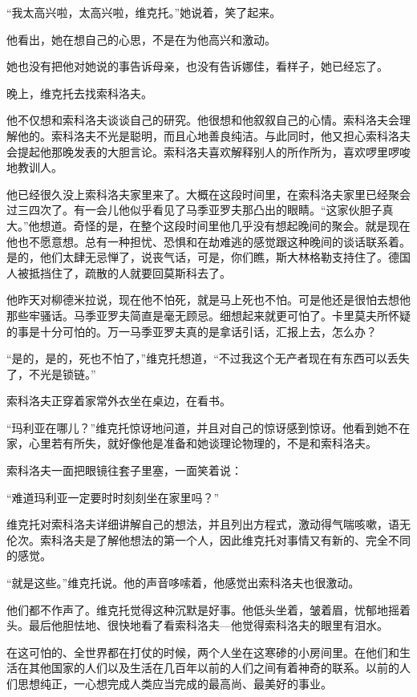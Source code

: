 “我太高兴啦，太高兴啦，维克托。”她说着，笑了起来。

他看出，她在想自己的心思，不是在为他高兴和激动。

她也没有把他对她说的事告诉母亲，也没有告诉娜佳，看样子，她已经忘了。

晚上，维克托去找索科洛夫。

他不仅想和索科洛夫谈谈自己的研究。他很想和他叙叙自己的心情。索科洛夫会理解他的。索科洛夫不光是聪明，而且心地善良纯洁。与此同时，他又担心索科洛夫会提起他那晚发表的大胆言论。索科洛夫喜欢解释别人的所作所为，喜欢啰里啰唆地教训人。

他已经很久没上索科洛夫家里来了。大概在这段时间里，在索科洛夫家里已经聚会过三四次了。有一会儿他似乎看见了马季亚罗夫那凸出的眼睛。“这家伙胆子真大。”他想道。奇怪的是，在整个这段时间里他几乎没有想起晚间的聚会。就是现在他也不愿意想。总有一种担忧、恐惧和在劫难逃的感觉跟这种晚间的谈话联系着。是的，他们太肆无忌惮了，说丧气话，可是，你们瞧，斯大林格勒支持住了。德国人被抵挡住了，疏散的人就要回莫斯科去了。

他昨天对柳德米拉说，现在他不怕死，就是马上死也不怕。可是他还是很怕去想他那些牢骚话。马季亚罗夫简直是毫无顾忌。细想起来就更可怕了。卡里莫夫所怀疑的事是十分可怕的。万一马季亚罗夫真的是拿话引话，汇报上去，怎么办？

“是的，是的，死也不怕了，”维克托想道，“不过我这个无产者现在有东西可以丢失了，不光是锁链。”

索科洛夫正穿着家常外衣坐在桌边，在看书。

“玛利亚在哪儿？”维克托惊讶地问道，并且对自己的惊讶感到惊讶。他看到她不在家，心里若有所失，就好像他是准备和她谈理论物理的，不是和索科洛夫。

索科洛夫一面把眼镜往套子里塞，一面笑着说：

“难道玛利亚一定要时时刻刻坐在家里吗？”

维克托对索科洛夫详细讲解自己的想法，并且列出方程式，激动得气喘咳嗽，语无伦次。索科洛夫是了解他想法的第一个人，因此维克托对事情又有新的、完全不同的感觉。

“就是这些。”维克托说。他的声音哆嗦着，他感觉出索科洛夫也很激动。

他们都不作声了。维克托觉得这种沉默是好事。他低头坐着，皱着眉，忧郁地摇着头。最后他胆怯地、很快地看了看索科洛夫—他觉得索科洛夫的眼里有泪水。

在这可怕的、全世界都在打仗的时候，两个人坐在这寒碜的小房间里。在他们和生活在其他国家的人们以及生活在几百年以前的人们之间有着神奇的联系。以前的人们思想纯正，一心想完成人类应当完成的最高尚、最美好的事业。

